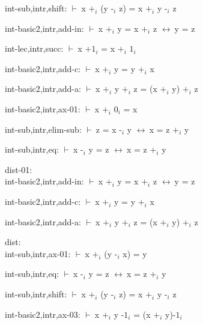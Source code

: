 \documentclass[a4paper]{article}
\newcommand{\Fol}{\mbox{$\vdash\ $}}
\newcommand{\Equiv}{\mbox{$\leftrightarrow\ $}}
\begin{document}
int-sub,intr,shift: 
 \Fol x $\mbox{+}_{i}$ (y $\mbox{-}_{i}$ z) = x $\mbox{+}_{i}$ y $\mbox{-}_{i}$ z



int-basic2,intr,add-in: 
 \Fol x $\mbox{+}_{i}$ y = x $\mbox{+}_{i}$ z \Equiv y = z



int-lec,intr,succ: 
 \Fol x $\mbox{+1}_{i}$ = x $\mbox{+}_{i}$ $\mbox{1}_{i}$



int-basic2,intr,add-c: 
 \Fol x $\mbox{+}_{i}$ y = y $\mbox{+}_{i}$ x



int-basic2,intr,add-a: 
 \Fol x $\mbox{+}_{i}$ y $\mbox{+}_{i}$ z = (x $\mbox{+}_{i}$ y) $\mbox{+}_{i}$ z



int-basic2,intr,ax-01: 
 \Fol x $\mbox{+}_{i}$ $\mbox{0}_{i}$ = x



int-sub,intr,elim-sub: 
 \Fol z = x $\mbox{-}_{i}$ y \Equiv x = z $\mbox{+}_{i}$ y



int-sub,intr,eq: 
 \Fol x $\mbox{-}_{i}$ y = z \Equiv x = z $\mbox{+}_{i}$ y



\bigskip

dist-01:\\ int-basic2,intr,add-in: 
 \Fol x $\mbox{+}_{i}$ y = x $\mbox{+}_{i}$ z \Equiv y = z



int-basic2,intr,add-c: 
 \Fol x $\mbox{+}_{i}$ y = y $\mbox{+}_{i}$ x



int-basic2,intr,add-a: 
 \Fol x $\mbox{+}_{i}$ y $\mbox{+}_{i}$ z = (x $\mbox{+}_{i}$ y) $\mbox{+}_{i}$ z



\bigskip

dist:\\ int-sub,intr,ax-01: 
 \Fol x $\mbox{+}_{i}$ (y $\mbox{-}_{i}$ x) = y



int-sub,intr,eq: 
 \Fol x $\mbox{-}_{i}$ y = z \Equiv x = z $\mbox{+}_{i}$ y



int-sub,intr,shift: 
 \Fol x $\mbox{+}_{i}$ (y $\mbox{-}_{i}$ z) = x $\mbox{+}_{i}$ y $\mbox{-}_{i}$ z



int-basic2,intr,ax-03: 
 \Fol x $\mbox{+}_{i}$ y $\mbox{-1}_{i}$ = (x $\mbox{+}_{i}$ y)$\mbox{-1}_{i}$
\end{document}
